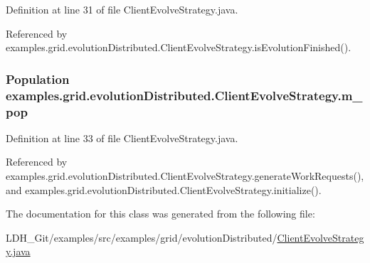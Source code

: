 Definition at line 31 of file Client\-Evolve\-Strategy.\-java.



Referenced by examples.\-grid.\-evolution\-Distributed.\-Client\-Evolve\-Strategy.\-is\-Evolution\-Finished().

\hypertarget{classexamples_1_1grid_1_1evolution_distributed_1_1_client_evolve_strategy_aaa3ff06ee06818aa8240564231e03e64}{
\subsubsection[{m\-\_\-pop}]{\setlength{\rightskip}{0pt plus 5cm}Population examples.\-grid.\-evolution\-Distributed.\-Client\-Evolve\-Strategy.\-m\-\_\-pop\hspace{0.3cm}{\ttfamily [private]}}}\label{classexamples_1_1grid_1_1evolution_distributed_1_1_client_evolve_strategy_aaa3ff06ee06818aa8240564231e03e64}


Definition at line 33 of file Client\-Evolve\-Strategy.\-java.



Referenced by examples.\-grid.\-evolution\-Distributed.\-Client\-Evolve\-Strategy.\-generate\-Work\-Requests(), and examples.\-grid.\-evolution\-Distributed.\-Client\-Evolve\-Strategy.\-initialize().



The documentation for this class was generated from the following file\-:\begin{DoxyCompactItemize}
\item 
L\-D\-H\-\_\-\-Git/examples/src/examples/grid/evolution\-Distributed/\hyperlink{evolution_distributed_2_client_evolve_strategy_8java}{Client\-Evolve\-Strategy.\-java}\end{DoxyCompactItemize}
